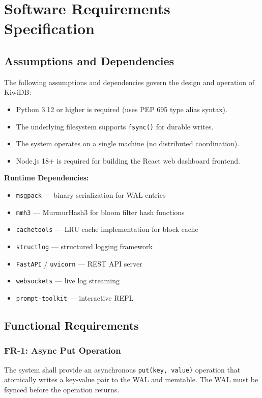 \documentclass[oneside,a4paper,12pt]{book}
\begin{document}
\chapter{Software Requirements Specification}

\section{Assumptions and Dependencies}

The following assumptions and dependencies govern the design and operation of KiwiDB:

\begin{itemize}[leftmargin=2em]
    \item Python 3.12 or higher is required (uses PEP 695 type alias syntax).
    \item The underlying filesystem supports \texttt{fsync()} for durable writes.
    \item The system operates on a single machine (no distributed coordination).
    \item Node.js 18+ is required for building the React web dashboard frontend.
\end{itemize}
\textbf{Runtime Dependencies:}
\begin{itemize}[leftmargin=2em]
    \item \texttt{msgpack} --- binary serialization for WAL entries
    \item \texttt{mmh3} --- MurmurHash3 for bloom filter hash functions
    \item \texttt{cachetools} --- LRU cache implementation for block cache
    \item \texttt{structlog} --- structured logging framework
    \item \texttt{FastAPI} / \texttt{uvicorn} --- REST API server
    \item \texttt{websockets} --- live log streaming
    \item \texttt{prompt-toolkit} --- interactive REPL
\end{itemize}

\section{Functional Requirements}

\subsection{FR-1: Async Put Operation}
The system shall provide an asynchronous \texttt{put(key, value)} operation that atomically writes a key-value pair to the WAL and memtable. The WAL must be fsynced before the operation returns.
\end{document}
